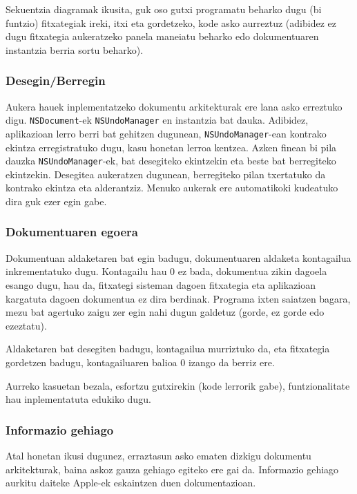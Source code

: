 Sekuentzia diagramak ikusita, guk oso gutxi programatu beharko dugu (bi funtzio) fitxategiak ireki, itxi eta gordetzeko, kode asko aurreztuz (adibidez ez dugu fitxategia aukeratzeko panela maneiatu beharko edo dokumentuaren instantzia berria sortu beharko).

\subsubsection{Desegin/Berregin}
Aukera hauek inplementatzeko dokumentu arkitekturak ere lana asko erreztuko digu. \texttt{NSDocument}-ek \texttt{NSUndoManager} en instantzia bat dauka. Adibidez, aplikazioan lerro berri bat gehitzen dugunean, \texttt{NSUndoManager}-ean kontrako ekintza erregistratuko dugu, kasu honetan lerroa kentzea. Azken finean bi pila dauzka \texttt{NSUndoManager}-ek, bat desegiteko ekintzekin eta beste bat berregiteko ekintzekin. Desegitea aukeratzen dugunean, berregiteko pilan txertatuko da kontrako ekintza eta alderantziz. Menuko aukerak ere automatikoki kudeatuko dira guk ezer egin gabe.

\subsubsection{Dokumentuaren egoera}
Dokumentuan aldaketaren bat egin badugu, dokumentuaren aldaketa kontagailua inkrementatuko dugu. Kontagailu hau 0 ez bada, dokumentua zikin dagoela esango dugu, hau da, fitxategi sisteman dagoen fitxategia eta aplikazioan kargatuta dagoen dokumentua ez dira berdinak. Programa ixten saiatzen bagara, mezu bat agertuko zaigu zer egin nahi dugun galdetuz (gorde, ez gorde edo ezeztatu).

Aldaketaren bat desegiten badugu, kontagailua murriztuko da, eta fitxategia gordetzen badugu, kontagailuaren balioa 0 izango da berriz ere.

Aurreko kasuetan bezala, esfortzu gutxirekin (kode lerrorik gabe), funtzionalitate hau inplementatuta edukiko dugu.

\subsubsection{Informazio gehiago}
Atal honetan ikusi dugunez, erraztasun asko ematen dizkigu dokumentu arkitekturak, baina askoz gauza gehiago egiteko ere gai da. Informazio gehiago aurkitu daiteke Apple-ek eskaintzen duen dokumentazioan\cite{ap:dba}.

